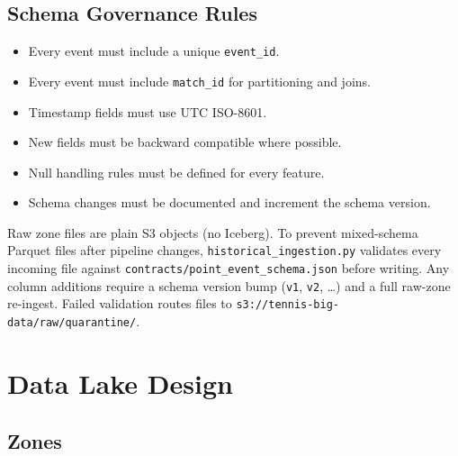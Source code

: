 \documentclass[11pt,a4paper]{article}
\begin{document}
\subsection{Schema Governance Rules}

\begin{itemize}[nosep]
  \item Every event must include a unique \texttt{event\_id}.
  \item Every event must include \texttt{match\_id} for partitioning and joins.
  \item Timestamp fields must use UTC ISO-8601.
  \item New fields must be backward compatible where possible.
  \item Null handling rules must be defined for every feature.
  \item Schema changes must be documented and increment the schema version.
\end{itemize}

\begin{importantbox}
Raw zone files are plain S3 objects (no Iceberg). To prevent mixed-schema Parquet files after
pipeline changes, \texttt{historical\_ingestion.py} validates every incoming file against
\texttt{contracts/point\_event\_schema.json} before writing. Any column additions require a schema
version bump (\texttt{v1}, \texttt{v2}, \ldots) and a full raw-zone re-ingest. Failed validation
routes files to \texttt{s3://tennis-big-data/raw/quarantine/}.
\end{importantbox}

\section{Data Lake Design}

\subsection{Zones}
\end{document}
